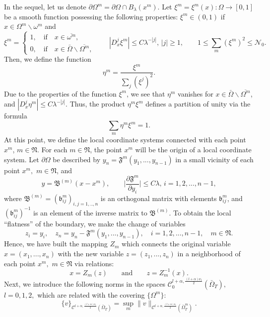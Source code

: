 \documentclass[reqno]{amsart}
\def\C {\mathcal{C}}
\theoremstyle{definition}
\numberwithin{equation}{section}
\begin{document}
In the sequel, let us denote $\partial\Omega^{m}=\partial\Omega\cap B_{\lambda}(x^{m})$.
Let $\xi^{m}=\xi^{m}(x):\Omega\to[0,1]$ be a smooth function possessing the following properties: $\xi^{m}\in(0,1)$ if $x\in\Omega^{m}\backslash\omega^{m}$ and
\[
\xi^{m}=\begin{cases}
1,\quad\text{if}\quad x\in\overline{\omega^{m}},\\
0,\quad\text{if}\quad x\in\bar{\Omega}\backslash\overline{\Omega^{m}},
\end{cases}
\qquad |D_{x}^{j}\xi^{m}|\leq C\lambda^{-|j|},\, |j|\geq 1,\qquad 1\leq \sum_{m}(\xi^{m})^{2}\leq \mathcal{N}_{0}.
\]
Then, we define the function
\begin{equation}\label{5.0*}
\eta^{m}=\frac{\xi^{m}}{\sum_{j}(\xi^{j})^{2}}.
\end{equation}
Due to the properties of the function $\xi^{m}$,
we see that $\eta^{m}$ vanishes for $x\in\bar{\Omega}\backslash\overline{\Omega^{m}}$, and $|D_{x}^{j}\eta^{m}|\leq C\lambda^{-|j|}$. Thus, the product $\eta^{m}\xi^{m}$ defines a partition of unity via the formula
\[
\sum_{m}\eta^{m}\xi^{m}=1.
\]
At this point, we define the local coordinate systems connected with each point $x^{m}$, $m\in\mathfrak{N}$. For each $m\in\mathfrak{N}$, the point $x^{m}$ will be the origin of a local coordinate system. Let
$\partial\Omega$ be described by $y_n=\mathfrak{F}^{m}(y_1,...,y_{n-1})$ in a small vicinity of each point $x^{m},$ $m\in\mathfrak{N}$, and
\[
y=\mathfrak{B}^{(m)}(x-x^{m}),\qquad \bigg|\frac{\partial \mathfrak{F}^{m}}{\partial y_i}\bigg|\leq C\lambda,\, i=1,2,...,n-1,
\]
where $\mathfrak{B}^{(m)}=(\mathfrak{b}_{ij}^{m})_{i,j=1,..,n}$ is an orthogonal matrix with elements $\mathfrak{b}_{ij}^{m}$, and
$(\mathfrak{b}_{ij}^{m})^{-1}$ is an element of the inverse matrix to  $\mathfrak{B}^{(m)}$. To obtain the local ``flatness'' of the boundary, we make the change of variables
\[
z_i=y_i,\quad z_n=y_n-\mathfrak{F}^{m}(y_1,...,y_{n-1}),\quad i=1,2,...,n-1,\quad m\in\mathfrak{N}.
\]
Hence, we have built the mapping $Z_{m}$ which connects the
original variable $x=(x_1,...,x_n)$ with the
new variable $z=(z_1,...,z_n)$ in a neighborhood of each point $x^{m},$ $m\in\mathfrak{N}$ via relations:
\[
x=Z_{m}(z)\qquad\text{and}\qquad z=Z^{-1}_{m}(x).
\]
Next, we introduce the following norms in the spaces $\C_{0}^{l+\alpha,\frac{(l+\alpha)\nu_{1}}{2}}(\bar{\Omega}_{T}),$ $l=0,1,2,$ which are related with the covering $\{\Omega^{m}\}$:
\[
\{v\}_{\C^{l+\alpha,\frac{(l+\alpha)\nu_{1}}{2}}(\bar{\Omega}_{T})}=
\sup_m\|v\|_{\C^{l+\alpha,\frac{(l+\alpha)\nu_{1}}{2}}(\bar{\Omega}^{m}_{T})}.
\]
\end{document}
